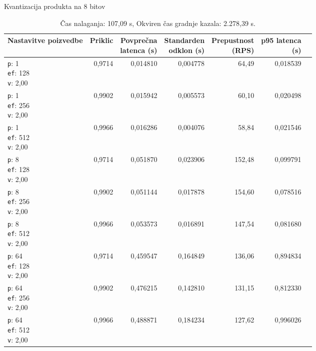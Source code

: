 \begin{table}[htbp]
  \centering
\small
  \caption{Kvantizacija produkta na 8 bitov}
  \label{tab:single-2cpu-4ram:pqx4:qdrant-dipl-baseline-tenant-subgraph-pqx4-m16-ef-128-random-768-100-tenants-extended-upload-2026-08-17-23-42-50.json}
  \begin{tabularx}{\textwidth}{Xrrrrrr}
    \toprule
    Nastavitve poizvedbe & Priklic & \makecell{Povprečna\\latenca (s)} & \makecell{Standarden\\odklon (s)} & \makecell{Prepustnost\\(RPS)} & \makecell{p95 latenca\\(s)}  \\
    \midrule
    \makecell{\texttt{p}: 1\\\texttt{ef}: 128\\\texttt{v}: 2,00} & 0,9714 & 0,014810 & 0,004778 & 64,49 & 0,018539 \\
    \makecell{\texttt{p}: 1\\\texttt{ef}: 256\\\texttt{v}: 2,00} & 0,9902 & 0,015942 & 0,005573 & 60,10 & 0,020498 \\
    \makecell{\texttt{p}: 1\\\texttt{ef}: 512\\\texttt{v}: 2,00} & 0,9966 & 0,016286 & 0,004076 & 58,84 & 0,021546 \\
    \makecell{\texttt{p}: 8\\\texttt{ef}: 128\\\texttt{v}: 2,00} & 0,9714 & 0,051870 & 0,023906 & 152,48 & 0,099791 \\
    \makecell{\texttt{p}: 8\\\texttt{ef}: 256\\\texttt{v}: 2,00} & 0,9902 & 0,051144 & 0,017878 & 154,60 & 0,078516 \\
    \makecell{\texttt{p}: 8\\\texttt{ef}: 512\\\texttt{v}: 2,00} & 0,9966 & 0,053573 & 0,016891 & 147,54 & 0,081680 \\
    \makecell{\texttt{p}: 64\\\texttt{ef}: 128\\\texttt{v}: 2,00} & 0,9714 & 0,459547 & 0,164849 & 136,06 & 0,894834 \\
    \makecell{\texttt{p}: 64\\\texttt{ef}: 256\\\texttt{v}: 2,00} & 0,9902 & 0,476215 & 0,142810 & 131,15 & 0,812330 \\
    \makecell{\texttt{p}: 64\\\texttt{ef}: 512\\\texttt{v}: 2,00} & 0,9966 & 0,488871 & 0,184234 & 127,62 & 0,996026 \\
    \bottomrule
  \end{tabularx}
\caption* {Čas nalaganja: 107,09 s, Okviren čas gradnje kazala: 2.278,39 s.}\end{table}


